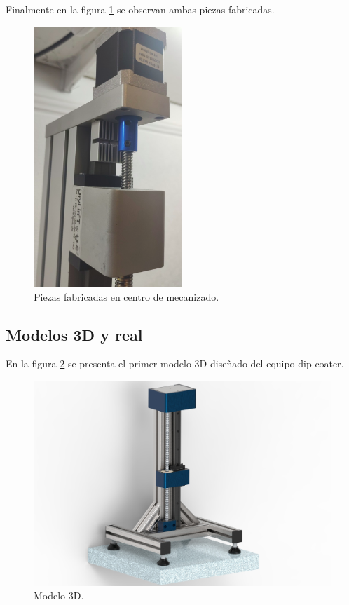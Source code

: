 Finalmente en la figura \ref{fig:real_custom} se observan ambas piezas fabricadas.

\begin{figure}[h]
	\centering
	\includegraphics[width=0.5\textwidth]{./Figures/real_custom.png}
	\caption{Piezas fabricadas en centro de mecanizado.}
	\label{fig:real_custom}
\end{figure}


\subsection{Modelos 3D y real}

En la figura \ref{fig:mecanica_3d_model} se presenta el primer modelo 3D diseñado del equipo dip coater.
\begin{figure}[h]
	\centering
	\includegraphics[width=1\textwidth]{./Figures/3d.jpg}
	\caption{Modelo 3D.}
	\label{fig:mecanica_3d_model}
\end{figure}


